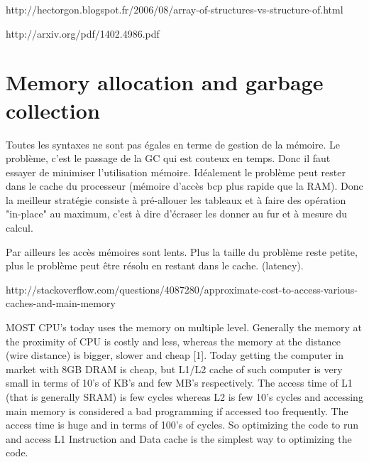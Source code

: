 http://hectorgon.blogspot.fr/2006/08/array-of-structures-vs-structure-of.html

http://arxiv.org/pdf/1402.4986.pdf

\newpage
\section{Memory allocation and garbage collection}

Toutes les syntaxes ne sont pas égales en terme de gestion de la mémoire.
Le problème, c'est le passage de la GC qui est couteux en temps. Donc il faut essayer de minimiser l'utilisation mémoire. Idéalement le problème peut rester dans le cache du processeur (mémoire d'accès bcp plus rapide que la RAM). Donc la meilleur stratégie consiste à pré-allouer les tableaux et à faire des opération "in-place" au maximum, c'est à dire d'écraser les donner au fur et à mesure du calcul.

Par ailleurs les accès mémoires sont lents. 
Plus la taille du problème reste petite, plus le problème peut être résolu en restant dans le cache. (latency).

http://stackoverflow.com/questions/4087280/approximate-cost-to-access-various-caches-and-main-memory

MOST CPU’s today uses the memory on multiple level.  Generally  the  memory  at  the  proximity  of  CPU  is costly and less, whereas the memory at the distance (wire distance)  is  bigger,  slower  and  cheap [1].  Today  getting  the  computer  in  market  with  8GB  DRAM  is  cheap,  but  L1/L2  cache  of  such  computer  is  very  small  in  terms  of 10’s  of  KB’s  and  few  MB’s  respectively.  The  access time  of  L1  (that  is  generally  SRAM) is  few  cycles whereas  L2  is  few  10’s  cycles  and  accessing  main memory  is  considered  a  bad  programming  if  accessed too  frequently.  The  access  time  is  huge  and  in  terms  of 100’s of cycles. So optimizing the code to run and access L1  Instruction  and  Data  cache  is  the  simplest  way  to optimizing the code.


